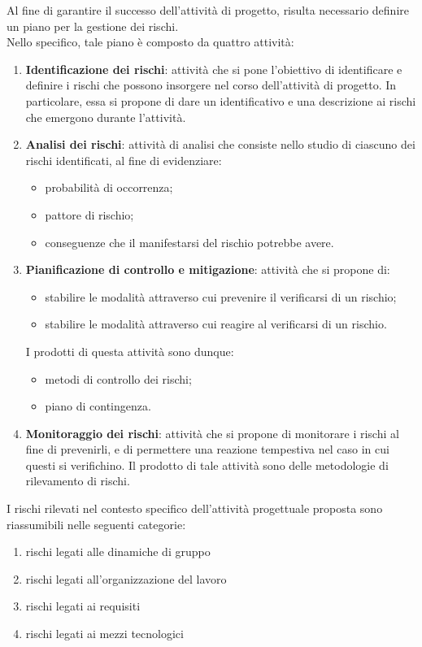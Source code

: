 	Al fine di garantire il successo dell'attività di progetto, risulta necessario definire un piano per la gestione dei rischi. \\
	Nello specifico, tale piano è composto da quattro attività:
	\begin{enumerate}
		\item \textbf{Identificazione dei rischi}: attività che si pone l'obiettivo di identificare e definire i rischi che possono insorgere nel corso dell'attività di progetto. In particolare, essa si propone di dare un identificativo e una descrizione ai rischi che emergono durante l'attività.
		\item \textbf{Analisi dei rischi}: attività di analisi che consiste nello studio di ciascuno dei rischi identificati, al fine di evidenziare:
		\begin{itemize}
			\item probabilità di occorrenza;
			\item pattore di rischio;
			\item conseguenze che il manifestarsi del rischio potrebbe avere.
		\end{itemize}
		\item \textbf{Pianificazione di controllo e mitigazione}: attività che si propone di:
			\begin{itemize}
				\item stabilire le modalità attraverso cui prevenire il verificarsi di un rischio;
				\item stabilire le modalità attraverso cui reagire al verificarsi di un rischio.
			\end{itemize}
			I prodotti di questa attività sono dunque:
			\begin{itemize}
				\item metodi di controllo dei rischi;
				\item piano di contingenza.
			\end{itemize}
		\item \textbf{Monitoraggio dei rischi}: attività che si propone di monitorare i rischi al fine di prevenirli, e di permettere una reazione tempestiva nel caso in cui questi si verifichino. Il prodotto di tale attività sono delle metodologie di rilevamento di rischi.
	\end{enumerate}
	
	I rischi rilevati nel contesto specifico dell'attività progettuale proposta sono riassumibili nelle seguenti categorie:
	\begin{enumerate}
		\item rischi legati alle dinamiche di gruppo
		\item rischi legati all'organizzazione del lavoro
		\item rischi legati ai requisiti
		\item rischi legati ai mezzi tecnologici
	\end{enumerate}

